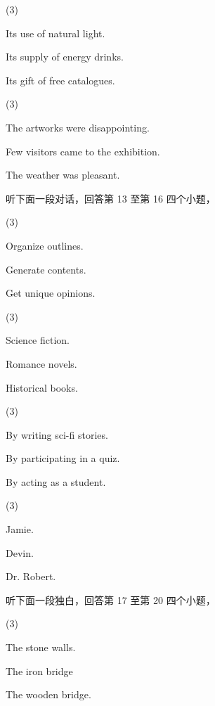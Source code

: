 \documentclass{英语试卷}
\begin{document}
\begin{choices}(3)
  \item Its use of natural light.
  \item Its supply of energy drinks.
  \item Its gift of free catalogues.
\end{choices}
\begin{choices}(3)
  \item The artworks were disappointing.
  \item Few visitors came to the exhibition.
  \item The weather was pleasant.
\end{choices}
\par 听下面一段对话，回答第 13 至第 16 四个小题，\par
{}
\begin{choices}(3)
  \item Organize outlines.
  \item Generate contents.
  \item Get unique opinions.
\end{choices}
\begin{choices}(3)
  \item Science fiction.
  \item Romance novels.
  \item Historical books.
\end{choices}
\begin{choices}(3)
  \item By writing sci-fi stories.
  \item By participating in a quiz.
  \item By acting as a student.
\end{choices}
\begin{choices}(3)
  \item Jamie.
  \item Devin.
  \item Dr. Robert.
\end{choices}
\par 听下面一段独白，回答第 17 至第 20 四个小题，\par
{}
\begin{choices}(3)
  \item The stone walls.
  \item The iron bridge
  \item The wooden bridge.
\end{choices}
\end{document}
